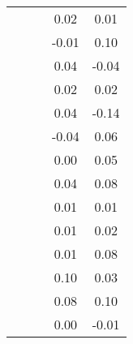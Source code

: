\begin{table}
\begin{tabular}{c|cc|cc|}
\multicolumn{1}{|c|}{} & \multicolumn{1}{|c|}{} & \multicolumn{1}{|c|}{} & \multicolumn{1}{|c|}{      0.02} & \multicolumn{1}{|c|}{      0.01} \\ 
\multicolumn{1}{|c|}{} & \multicolumn{1}{|c|}{} & \multicolumn{1}{|c|}{} & \multicolumn{1}{|c|}{     -0.01} & \multicolumn{1}{|c|}{      0.10} \\ 
\multicolumn{1}{|c|}{} & \multicolumn{1}{|c|}{} & \multicolumn{1}{|c|}{} & \multicolumn{1}{|c|}{      0.04} & \multicolumn{1}{|c|}{     -0.04} \\ 
\multicolumn{1}{|c|}{} & \multicolumn{1}{|c|}{} & \multicolumn{1}{|c|}{} & \multicolumn{1}{|c|}{      0.02} & \multicolumn{1}{|c|}{      0.02} \\ 
\multicolumn{1}{|c|}{} & \multicolumn{1}{|c|}{} & \multicolumn{1}{|c|}{} & \multicolumn{1}{|c|}{      0.04} & \multicolumn{1}{|c|}{     -0.14} \\ 
\multicolumn{1}{|c|}{} & \multicolumn{1}{|c|}{} & \multicolumn{1}{|c|}{} & \multicolumn{1}{|c|}{     -0.04} & \multicolumn{1}{|c|}{      0.06} \\ 
\multicolumn{1}{|c|}{} & \multicolumn{1}{|c|}{} & \multicolumn{1}{|c|}{} & \multicolumn{1}{|c|}{      0.00} & \multicolumn{1}{|c|}{      0.05} \\ 
\multicolumn{1}{|c|}{} & \multicolumn{1}{|c|}{} & \multicolumn{1}{|c|}{} & \multicolumn{1}{|c|}{      0.04} & \multicolumn{1}{|c|}{      0.08} \\ 
\multicolumn{1}{|c|}{} & \multicolumn{1}{|c|}{} & \multicolumn{1}{|c|}{} & \multicolumn{1}{|c|}{      0.01} & \multicolumn{1}{|c|}{      0.01} \\ 
\multicolumn{1}{|c|}{} & \multicolumn{1}{|c|}{} & \multicolumn{1}{|c|}{} & \multicolumn{1}{|c|}{      0.01} & \multicolumn{1}{|c|}{      0.02} \\ 
\multicolumn{1}{|c|}{} & \multicolumn{1}{|c|}{} & \multicolumn{1}{|c|}{} & \multicolumn{1}{|c|}{      0.01} & \multicolumn{1}{|c|}{      0.08} \\ 
\multicolumn{1}{|c|}{} & \multicolumn{1}{|c|}{} & \multicolumn{1}{|c|}{} & \multicolumn{1}{|c|}{      0.10} & \multicolumn{1}{|c|}{      0.03} \\ 
\multicolumn{1}{|c|}{} & \multicolumn{1}{|c|}{} & \multicolumn{1}{|c|}{} & \multicolumn{1}{|c|}{      0.08} & \multicolumn{1}{|c|}{      0.10} \\ 
\multicolumn{1}{|c|}{} & \multicolumn{1}{|c|}{} & \multicolumn{1}{|c|}{} & \multicolumn{1}{|c|}{      0.00} & \multicolumn{1}{|c|}{     -0.01} \\ 

\end{tabular}
\end{table}
